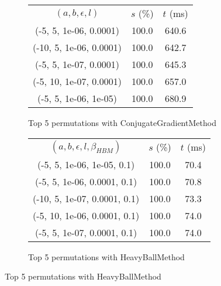 \begin{figure}[H]
{\begin{subfigure}[ht]{.6\textwidth}
\begin{tabular}{|c|c|c|}
\hline
\rowcolor{gray!25}
\multicolumn{3}{|c|}{ConjugateGradientMethod} \\
\hline
\rowcolor{gray!25}
$(a,b,\epsilon,l)$ & $s$ (\%) & $t$ (ms) \\
\hline
(-5, 5, 1e-06, 0.0001) & 100.0 & 640.6 \\
(-10, 5, 1e-06, 0.0001) & 100.0 & 642.7 \\
(-5, 5, 1e-07, 0.0001) & 100.0 & 645.3 \\
(-5, 10, 1e-07, 0.0001) & 100.0 & 657.0 \\
(-5, 5, 1e-06, 1e-05) & 100.0 & 680.9 \\
\hline
\end{tabular}
\caption{Top 5 permutations with ConjugateGradientMethod}
\label{subfig:param_comp_NegativeEntropy_ConjugateGradientMethod_DichotomousSearch}
\end{subfigure}
\hfill
\begin{subfigure}[ht]{.6\textwidth}
\centering
{}
\begin{tabular}{|c|c|c|}
\hline
\rowcolor{gray!25}
\multicolumn{3}{|c|}{HeavyBallMethod} \\
\hline
\rowcolor{gray!25}
$(a,b,\epsilon,l,\beta_{HBM})$ & $s$ (\%) & $t$ (ms) \\
\hline
(-5, 5, 1e-06, 1e-05, 0.1) & 100.0 & 70.4 \\
(-5, 5, 1e-06, 0.0001, 0.1) & 100.0 & 70.8 \\
(-10, 5, 1e-07, 0.0001, 0.1) & 100.0 & 73.3 \\
(-5, 10, 1e-06, 0.0001, 0.1) & 100.0 & 74.0 \\
(-5, 5, 1e-07, 0.0001, 0.1) & 100.0 & 74.0 \\
\hline
\end{tabular}
\caption{Top 5 permutations with HeavyBallMethod}
\label{subfig:param_comp_NegativeEntropy_HeavyBallMethod_DichotomousSearch}
\end{subfigure}
}
\end{figure}